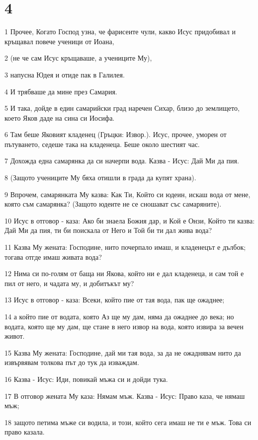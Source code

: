 \chapter{4}

\par 1 Прочее, Когато Господ узна, че фарисеите чули, какво Исус придобивал и кръщавал повече ученици от Иоана,
\par 2 (не че сам Исус кръщаваше, а учениците Му),
\par 3 напусна Юдея и отиде пак в Галилея.
\par 4 И трябваше да мине през Самария.
\par 5 И така, дойде в един самарийски град наречен Сихар, близо до землището, което Яков даде на сина си Иосифа.
\par 6 Там беше Яковият кладенец (Гръцки: Извор.). Исус, прочее, уморен от пътуването, седеше така на кладенеца. Беше около шестият час.
\par 7 Дохожда една самарянка да си начерпи вода. Казва - Исус: Дай Ми да пия.
\par 8 (Защото учениците Му бяха отишли в града да купят храна).
\par 9 Впрочем, самарянката Му казва: Как Ти, Който си юдеин, искаш вода от мене, която съм самарянка? (Защото юдеите не се сношават със самаряните).
\par 10 Исус в отговор - каза: Ако би знаела Божия дар, и Кой е Онзи, Който ти казва: Дай Ми да пия, ти би поискала от Него и Той би ти дал жива вода?
\par 11 Казва Му жената: Господине, нито почерпало имаш, и кладенецът е дълбок; тогава отгде имаш живата вода?
\par 12 Нима си по-голям от баща ни Якова, който ни е дал кладенеца, и сам той е пил от него, и чадата му, и добитъкът му?
\par 13 Исус в отговор - каза: Всеки, който пие от тая вода, пак ще ожаднее;
\par 14 а който пие от водата, която Аз ще му дам, няма да ожаднее до века; но водата, която ще му дам, ще стане в него извор на вода, която извира за вечен живот.
\par 15 Казва Му жената: Господине, дай ми тая вода, за да не ожаднявам нито да извървявам толкова път до тук да изваждам.
\par 16 Казва - Исус: Иди, повикай мъжа си и дойди тука.
\par 17 В отговор жената Му каза: Нямам мъж. Казва - Исус: Право каза, че нямаш мъж;
\par 18 защото петима мъже си водила, и този, който сега имаш не ти е мъж. Това си право казала.
